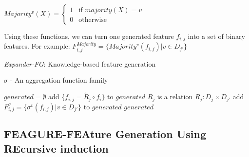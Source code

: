 \documentclass{article}
\theoremstyle{definition}
\begin{document}
$Majority^v(X)=\begin{cases} 1 &\mbox{if } majority(X)=v
\\ 
0 & \mbox{otherwise } \end{cases}$

Using these functions, we can turn one generated feature $f_{i,j}$ into a set of binary features. %
For example:  $F_{i,j}^{Majority}=\{Majority^v(f_{i,j})|v\in D_{j'}\}$


\begin{algorithm}[H]
	\caption{\emph{Expander-FG}: Knowledge-based feature generation}
	\label{code-compete}
	\small
	$\sigma$ - An aggregation function family
	\begin{algorithmic}
		\State $generated=\emptyset$
		\State add $\{f_{i,j}=\tilde{R}_j\circ f_i\}$ to $generated$
		\EndIf
		\Else \Comment $R_j$ is a relation $R_j:D_j\times D_{j'}$
		\State add $F^\sigma_{i,j}=\{\sigma^v(f_{i,j})|v\in D_{j'}\}$ to $generated$
		\EndIf
		\EndIf
		\EndFor
		\EndFor
		\State \Return $generated$ 
		\EndFunction
		
	\end{algorithmic}
\end{algorithm}

\subsection{FEAGURE-FEAture Generation Using REcursive induction}
\label{algorithm_section}
\end{document}
